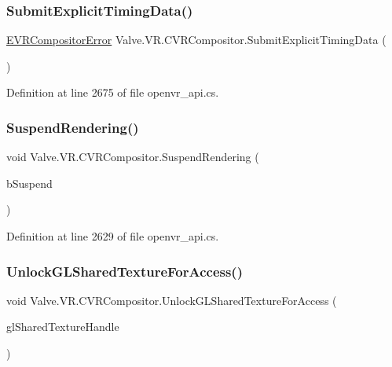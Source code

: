 \subsubsection{\texorpdfstring{SubmitExplicitTimingData()}{SubmitExplicitTimingData()}}
{\footnotesize\ttfamily \mbox{\hyperlink{namespace_valve_1_1_v_r_ac34ee1034fda668ccd45f57676ded81b}{E\+V\+R\+Compositor\+Error}} Valve.\+V\+R.\+C\+V\+R\+Compositor.\+Submit\+Explicit\+Timing\+Data (\begin{DoxyParamCaption}{ }\end{DoxyParamCaption})}



Definition at line 2675 of file openvr\+\_\+api.\+cs.

\mbox{\label{class_valve_1_1_v_r_1_1_c_v_r_compositor_a1fa8f68ecca3092ff6bb5262dddb7d16}} 
\subsubsection{\texorpdfstring{SuspendRendering()}{SuspendRendering()}}
{\footnotesize\ttfamily void Valve.\+V\+R.\+C\+V\+R\+Compositor.\+Suspend\+Rendering (\begin{DoxyParamCaption}\item[{bool}]{b\+Suspend }\end{DoxyParamCaption})}



Definition at line 2629 of file openvr\+\_\+api.\+cs.

\mbox{\label{class_valve_1_1_v_r_1_1_c_v_r_compositor_a59a5f3ef4b8f461efb78a6050e50d07f}} 
\subsubsection{\texorpdfstring{UnlockGLSharedTextureForAccess()}{UnlockGLSharedTextureForAccess()}}
{\footnotesize\ttfamily void Valve.\+V\+R.\+C\+V\+R\+Compositor.\+Unlock\+G\+L\+Shared\+Texture\+For\+Access (\begin{DoxyParamCaption}\item[{Int\+Ptr}]{gl\+Shared\+Texture\+Handle }\end{DoxyParamCaption})}




